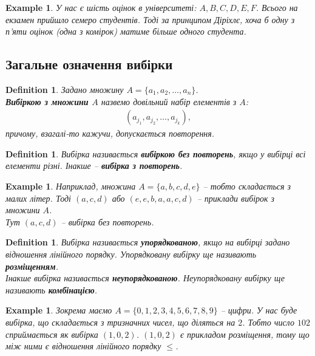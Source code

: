 \documentclass[a4paper, 14pt]{extarticle}
\theoremstyle{theoremdd}
\theoremstyle{theoremdd}
\newtheorem{definition}[theorem]{Definition}
\theoremstyle{theoremdd}
\theoremstyle{theoremdd}
\theoremstyle{theoremdd}
\newtheorem{example}[theorem]{Example}
\theoremstyle{theoremdd}
\theoremstyle{theoremdd}
\theoremstyle{theoremdd}
\theoremstyle{theoremdd}
\theoremstyle{theoremdd}
\theoremstyle{theoremdd}
\theoremstyle{theoremdd}
\theoremstyle{theoremdd}
\theoremstyle{theoremdd}
\theoremstyle{theoremdd}
\begin{document}
\begin{example}
У нас є шість оцінок в університеті: $A,B,C,D,E,F$. Всього на екзамен прийшло семеро студентів. Тоді за принципом Діріхлє, хоча б одну з п'яти оцінок (одна з комірок) матиме більше одного студента.
\end{example}

\subsection{Загальне означення вибірки}
\begin{definition}
Задано множину $A = \{a_1,a_2,\dots,a_n\}$.\\
\textbf{Вибіркою з множини $A$} назвемо довільний набір елементів з $A$:
\begin{align*}
(a_{j_1},a_{j_2},\dots,a_{j_k}),
\end{align*}
причому, взагалі-то кажучи, допускається повторення.
\end{definition}

\begin{definition}
Вибірка називається \textbf{вибіркою без повторень}, якщо у вибірці всі елементи різні. Інакше -- \textbf{вибірка з повторень}.
\end{definition}

\begin{example}
Наприклад, множина $A = \{a,b,c,d,e\}$ -- тобто складається з малих літер. Тоді $(a,c,d)$ або $(e,e,b,a,a,c,d)$ -- приклади вибірок з множини $A$.\\
Тут $(a,c,d)$ -- вибірка без повторень.
\end{example}

\begin{definition}
Вибірка називається \textbf{упорядкованою}, якщо на вибірці задано відношення лінійного порядку. Упорядковану вибірку ще називають \textbf{розміщенням}.\\
Інакше вибірка називається \textbf{неупорядкованою}. Неупорядковану вибірку ще називають \textbf{комбінацією}.
\end{definition}

\begin{example}
Зокрема маємо $A = \{0,1,2,3,4,5,6,7,8,9\}$ -- цифри. У нас буде вибірка, що складається з тризначних чисел, що діляться на $2$. Тобто число $102$ сприймається як вибірка $(1,0,2)$.
$(1,0,2)$ є прикладом розміщення, тому що між ними є відношення лінійного порядку $\leq$.
\end{example}
\end{document}
